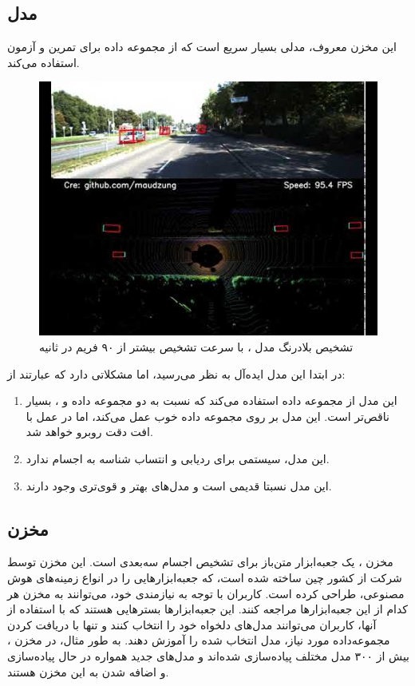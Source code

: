 \subsection{مدل }
این مخزن معروف، مدلی بسیار سریع است که از مجموعه داده  برای تمرین و آزمون استفاده می‌کند. 
\begin{figure}[h!]
    \centering
    \includegraphics[width=0.75\linewidth]{SFA3D.png}
    \caption{تشخیص بلادرنگ مدل ، با سرعت تشخیص بیشتر از ۹۰ فریم در ثانیه \cite{Super-Fast-Accurate-3D-Object-Detection-PyTorch}}
    \label{fig:SFA3D}
\end{figure}
در ابتدا این مدل ایده‌آل به نظر می‌رسید، اما مشکلاتی دارد که عبارتند از:
\begin{enumerate}
    \item این مدل از مجموعه داده  استفاده می‌کند که نسبت به دو مجموعه داده  و ، بسیار ناقص‌تر است. این مدل بر روی مجموعه داده  خوب عمل می‌کند، اما در عمل با افت دقت روبرو خواهد شد.
    \item این مدل، سیستمی برای ردیابی و انتساب شناسه به اجسام ندارد.
    \item این مدل نسبتا قدیمی است و مدل‌های بهتر و قوی‌تری وجود دارند.
\end{enumerate}

\subsection{مخزن }
مخزن ، یک جعبه‌ابزار متن‌باز برای تشخیص اجسام سه‌بعدی است. این مخزن توسط شرکت  از کشور چین ساخته شده است، که جعبه‌ابزارهایی را در انواع زمینه‌های هوش مصنوعی، طراحی کرده است. کاربران با توجه به نیازمندی خود، می‌توانند به مخزن هر کدام از این جعبه‌ابزارها مراجعه کنند. این جعبه‌ابزارها بسترهایی هستند که با استفاده از آنها، کاربران می‌توانند مدل‌های دلخواه خود را انتخاب کنند و تنها با دریافت کردن مجموعه‌داده مورد نیاز، مدل انتخاب شده را آموزش دهند. به طور مثال، در مخزن ، بیش از ۳۰۰ مدل مختلف پیاده‌سازی شده‌اند و مدل‌های جدید همواره در حال پیاده‌سازی و اضافه شدن به این مخزن هستند.

